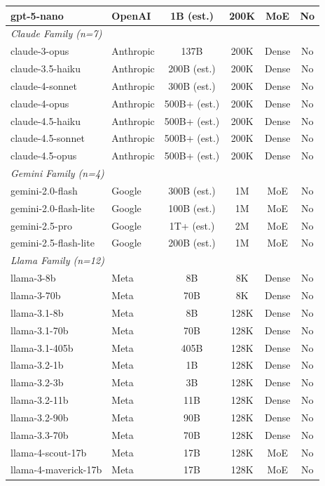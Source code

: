 \documentclass{article}
\begin{document}
\begin{table}[t]
\begin{tabular}{llcccc}
gpt-5-nano & OpenAI & 1B (est.) & 200K & MoE & No \\
\midrule
\multicolumn{6}{l}{\textit{Claude Family (n=7)}} \\
claude-3-opus & Anthropic & 137B & 200K & Dense & No \\
claude-3.5-haiku & Anthropic & 200B (est.) & 200K & Dense & No \\
claude-4-sonnet & Anthropic & 300B (est.) & 200K & Dense & No \\
claude-4-opus & Anthropic & 500B+ (est.) & 200K & Dense & No \\
claude-4.5-haiku & Anthropic & 500B+ (est.) & 200K & Dense & No \\
claude-4.5-sonnet & Anthropic & 500B+ (est.) & 200K & Dense & No \\
claude-4.5-opus & Anthropic & 500B+ (est.) & 200K & Dense & No \\
\midrule
\multicolumn{6}{l}{\textit{Gemini Family (n=4)}} \\
gemini-2.0-flash & Google & 300B (est.) & 1M & MoE & No \\
gemini-2.0-flash-lite & Google & 100B (est.) & 1M & MoE & No \\
gemini-2.5-pro & Google & 1T+ (est.) & 2M & MoE & No \\
gemini-2.5-flash-lite & Google & 200B (est.) & 1M & MoE & No \\
\midrule
\multicolumn{6}{l}{\textit{Llama Family (n=12)}} \\
llama-3-8b & Meta & 8B & 8K & Dense & No \\
llama-3-70b & Meta & 70B & 8K & Dense & No \\
llama-3.1-8b & Meta & 8B & 128K & Dense & No \\
llama-3.1-70b & Meta & 70B & 128K & Dense & No \\
llama-3.1-405b & Meta & 405B & 128K & Dense & No \\
llama-3.2-1b & Meta & 1B & 128K & Dense & No \\
llama-3.2-3b & Meta & 3B & 128K & Dense & No \\
llama-3.2-11b & Meta & 11B & 128K & Dense & No \\
llama-3.2-90b & Meta & 90B & 128K & Dense & No \\
llama-3.3-70b & Meta & 70B & 128K & Dense & No \\
llama-4-scout-17b & Meta & 17B & 128K & MoE & No \\
llama-4-maverick-17b & Meta & 17B & 128K & MoE & No \\

\end{tabular}
\end{table}
\end{document}
